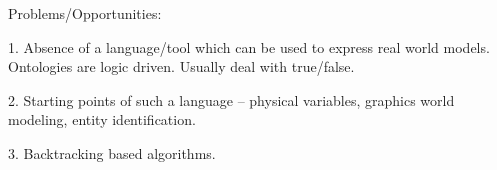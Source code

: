 Problems/Opportunities:

  1. Absence of a language/tool which can be used to express real world models. Ontologies are logic driven. Usually deal with true/false.

  2. Starting points of such a language -- physical variables, graphics world modeling, entity identification.

  3. Backtracking based algorithms.
